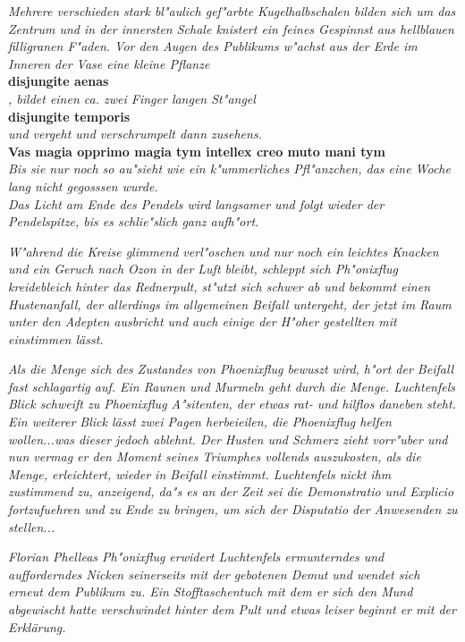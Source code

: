 \documentclass[a5paper,8pt]{book}
\begin{document}
\textit{Mehrere verschieden stark bl"aulich gef"arbte Kugelhalbschalen bilden sich um das Zentrum und in der innersten Schale knistert ein feines Gespinnst aus hellblauen 
filligranen F"aden. Vor den Augen des Publikums w"achst aus der Erde im Inneren der Vase eine kleine Pflanze}\\

\textbf{disjungite aenas}\\

\textit{, bildet einen ca. zwei Finger langen St"angel }\\

\textbf{disjungite temporis}\\

\textit{und vergeht und verschrumpelt dann zusehens.}\\

\textbf{Vas magia opprimo magia tym intellex creo muto mani tym}\\

\textit{Bis sie nur noch so au"sieht wie ein k"ummerliches Pfl"anzchen, das eine Woche lang nicht gegosssen wurde.}\\

\textit{Das Licht am Ende des Pendels wird langsamer und folgt wieder der Pendelspitze, bis es schlie"slich ganz aufh"ort.}

\textit{W"ahrend die Kreise glimmend verl"oschen und nur noch ein leichtes Knacken und ein Geruch nach Ozon in der Luft bleibt, schleppt sich Ph"onixflug kreidebleich hinter 
das Rednerpult, st"utzt sich schwer ab und bekommt einen Hustenanfall, der allerdings im allgemeinen Beifall untergeht, der jetzt im Raum unter den Adepten ausbricht und auch 
einige der H"oher gestellten mit einstimmen lässt. }

\textit{Als die Menge sich des Zustandes von Phoenixflug bewuszt wird, h"ort der Beifall fast schlagartig auf. Ein Raunen und Murmeln geht durch die Menge. Luchtenfels Blick 
schweift zu Phoenixflug A"sitenten, der etwas rat- und hilflos daneben steht. Ein weiterer Blick lässt zwei Pagen herbeieilen, die Phoenixflug helfen wollen...was dieser 
jedoch ablehnt. Der Husten und Schmerz zieht vorr"uber und nun vermag er den Moment seines Triumphes vollends auszukosten, als die Menge, erleichtert, wieder in Beifall 
einstimmt. Luchtenfels nickt ihm zustimmend zu, anzeigend, da"s es an der Zeit sei die Demonstratio und Explicio fortzufuehren und zu Ende zu bringen, um sich der Disputatio 
der Anwesenden zu stellen... }

\textit{Florian Phelleas Ph"onixflug erwidert Luchtenfels ermunterndes und aufforderndes Nicken seinerseits mit der gebotenen Demut und wendet sich erneut dem Publikum zu. 
Ein Stofftaschentuch mit dem er sich den Mund abgewischt hatte verschwindet hinter dem Pult und etwas leiser beginnt er mit der Erklärung.}
\end{document}
